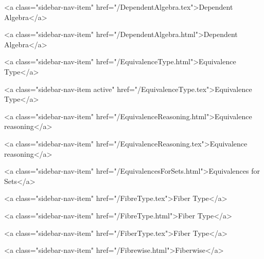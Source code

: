       
        
          <a class="sidebar-nav-item" href="/DependentAlgebra.tex">Dependent Algebra</a>
        
      
    
      
        
          <a class="sidebar-nav-item" href="/DependentAlgebra.html">Dependent Algebra</a>
        
      
    
      
        
          <a class="sidebar-nav-item" href="/EquivalenceType.html">Equivalence Type</a>
        
      
    
      
        
          <a class="sidebar-nav-item active" href="/EquivalenceType.tex">Equivalence Type</a>
        
      
    
      
        
          <a class="sidebar-nav-item" href="/EquivalenceReasoning.html">Equivalence reasoning</a>
        
      
    
      
        
          <a class="sidebar-nav-item" href="/EquivalenceReasoning.tex">Equivalence reasoning</a>
        
      
    
      
        
          <a class="sidebar-nav-item" href="/EquivalencesForSets.html">Equivalences for Sets</a>
        
      
    
      
        
          <a class="sidebar-nav-item" href="/FibreType.tex">Fiber Type</a>
        
      
    
      
        
          <a class="sidebar-nav-item" href="/FibreType.html">Fiber Type</a>
        
      
    
      
        
          <a class="sidebar-nav-item" href="/FiberType.tex">Fiber Type</a>
        
      
    
      
        
          <a class="sidebar-nav-item" href="/Fibrewise.html">Fiberwise</a>
        
